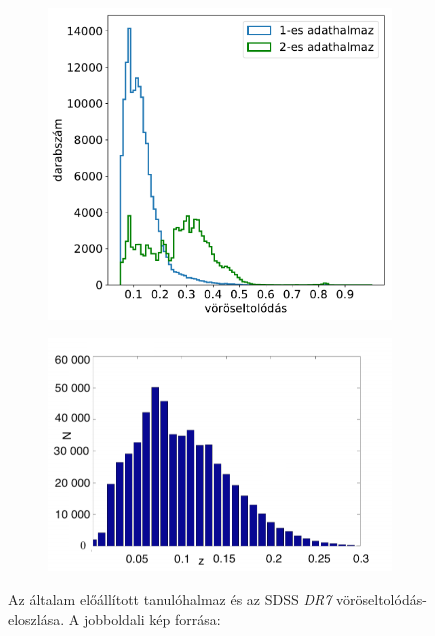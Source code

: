 \documentclass[12pt,letterpaper,oneside,openright]{book}
\begin{document}
 \begin{figure}[h!]
 \centering
  \hspace{-1.5cm}
  \begin{subfigure}[b]{0.40\textwidth}
    \includegraphics[width=\textwidth, height = \textwidth]{Figures/histsgoot.pdf}
    \label{fig:1}
  \end{subfigure}
  \hspace{0cm}
  \begin{subfigure}[b]{0.4\textwidth}
    \includegraphics[height=\textwidth ]{Figures/rsd2.png}
    \label{fig:2}
  \end{subfigure}
  \caption{Az általam előállított tanulóhalmaz és az SDSS \textit{DR7} vöröseltolódás-eloszlása. A jobboldali kép forrása: \cite{rsd}}
  \label{fig:dist}
 \end{figure}
\end{document}

